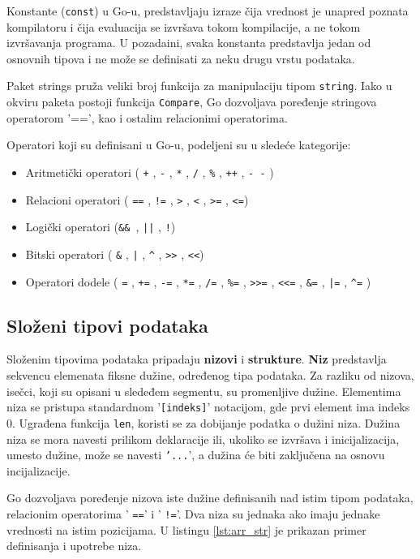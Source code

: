 \documentclass[12pt,oneside]{memoir}
\begin{document}
Konstante (\texttt{const}) u Go-u, predstavljaju izraze čija vrednost je unapred poznata kompilatoru i čija evaluacija se izvršava tokom kompilacije, a ne tokom izvršavanja programa. U pozadaini, svaka konstanta predstavlja jedan od osnovnih tipova i ne može se definisati za neku drugu vrstu podataka. 

Paket strings pruža veliki broj funkcija za manipulaciju tipom \texttt{string}. Iako u okviru paketa postoji funkcija \texttt{Compare}, Go dozvoljava poređenje stringova operatorom '==', kao i ostalim relacionimi operatorima.

Operatori koji su definisani u Go-u, podeljeni su u sledeće kategorije:
\begin{itemize}

\item Aritmetički operatori ( \texttt{+} ,  \texttt{-} , \texttt{*} ,  \texttt{/} ,  \texttt{\%} ,  \texttt{++} ,   \texttt{- -} )
\item Relacioni operatori ( \texttt{==} ,  \texttt{!=} ,  \texttt{>} ,  \texttt{<} ,  \texttt{>=} ,  \texttt{<=})
\item Logički operatori (\texttt{\&\& },  \texttt{||} ,  \texttt{!})
\item Bitski operatori ( \texttt{\&} ,  \texttt{|} ,  \texttt{\^} ,  \texttt{>{}>} ,  \texttt{<{}<})
\item Operatori dodele ( \texttt{=} ,  \texttt{+=} ,  \texttt{-=} ,  \texttt{*=} ,  \texttt{/=} ,  \texttt{\%=} ,   \texttt{>{}>=} ,  \texttt{<{}<=} ,  \texttt{\&=} ,  \texttt{|=} ,  \texttt{\^{}=} )

\end{itemize}

\subsection{Složeni tipovi podataka}
Složenim tipovima podataka pripadaju \textbf{nizovi} i \textbf{strukture}. \textbf{Niz} predstavlja sekvencu elemenata fiksne dužine, određenog tipa podataka. Za razliku od nizova, isečci, koji su opisani u sledeđem segmentu, su promenljive dužine. Elementima niza se pristupa standardnom '\texttt{[indeks]}' notacijom, gde prvi element ima indeks 0. Ugrađena funkcija \texttt{len}, koristi se za dobijanje podatka o dužini niza. Dužina niza se mora navesti prilikom deklaracije ili, ukoliko se izvršava i inicijalizacija, umesto dužine, može se navesti \texttt{'...}', a dužina će biti zaključena na osnovu incijalizacije.

Go dozvoljava poređenje nizova iste dužine definisanih nad istim tipom podataka, relacionim operatorima ' \texttt{==}' i ' \texttt{!=}'. Dva niza su jednaka ako imaju jednake vrednosti na istim pozicijama. U listingu \ref{lst:arr_str} je prikazan primer definisanja i upotrebe niza.
\\
\end{document}
